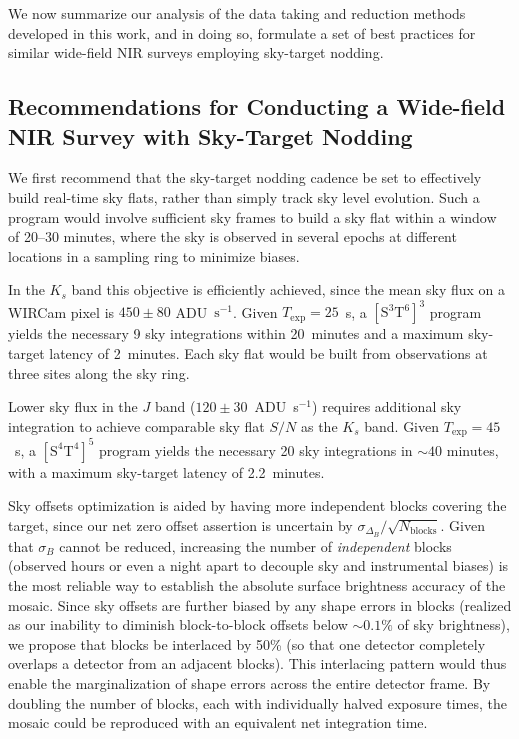 \documentclass[iop]{emulateapj}
\newcommand{\todo}[1]{\textcolor{BurntOrange}{\textsf{#1}}} %
\begin{document}
We now summarize our analysis of the data taking and reduction methods developed in this work, and in doing so, formulate a set of best practices for similar wide-field NIR surveys employing sky-target nodding.

\subsection{Recommendations for Conducting a Wide-field NIR Survey with Sky-Target Nodding}

We first recommend that the sky-target nodding cadence be set to effectively build real-time sky flats, rather than simply track sky level evolution.
Such a program would involve sufficient sky frames to build a sky flat within a window of 20--30 minutes, where the sky is observed in several epochs at different locations in a sampling ring to minimize biases.

In the $K_s$ band this objective is efficiently achieved, since the mean sky flux on a WIRCam pixel is $450 \pm 80$ ADU~$\mathrm{s^{-1}}$.
Given $T_\mathrm{exp}=25$~s, a $\mathrm{[S^3T^6]^3}$ program yields the necessary 9 sky integrations within 20~minutes and a maximum sky-target latency of 2~minutes.
Each sky flat would be built from observations at three sites along the sky ring.

Lower sky flux in the $J$ band ($120 \pm 30$~ADU~s$^{-1}$) requires additional sky integration  to achieve comparable sky flat $S/N$ as the $K_s$ band.
Given $T_\mathrm{exp}=45$~s, a $\mathrm{[S^4T^4]^5}$ program yields the necessary 20 sky integrations in $\sim 40$ minutes, with a maximum sky-target latency of 2.2~minutes.

Sky offsets optimization is aided by having more independent blocks covering the target, since our net zero offset assertion is uncertain by $\sigma_{\Delta_B} / \sqrt{N_\mathrm{blocks}}$.
Given that $\sigma_B$ cannot be reduced, increasing the number of \emph{independent} blocks (observed hours or even a night apart to decouple sky and instrumental biases) is the most reliable way to establish the absolute surface brightness accuracy of the mosaic.
Since sky offsets are further biased by any shape errors in blocks (realized as our inability to diminish block-to-block offsets below $\sim 0.1\%$ of sky brightness), we propose that blocks be interlaced by 50\% (so that one detector completely overlaps a detector from an adjacent blocks).
This interlacing pattern would thus enable the marginalization of shape errors across the entire detector frame.
By doubling the number of blocks, each with individually halved exposure times, the mosaic could be reproduced with an equivalent net integration time.
\end{document}
